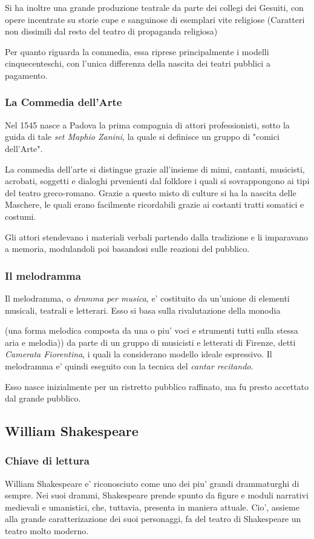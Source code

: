 \documentclass{article}
\begin{document}
{    Si ha inoltre una grande produzione teatrale da parte dei collegi dei Gesuiti, con opere incentrate su storie cupe e sanguinose di esemplari vite religiose \small{(Caratteri non dissimili dal resto del teatro di propaganda religiosa)}

    Per quanto riguarda la commedia, essa riprese principalmente i modelli cinquecenteschi, con l'unica differenza della nascita dei teatri pubblici a pagamento.

    \subsubsection{La Commedia dell'Arte}
    Nel 1545 nasce a Padova la prima compagnia di attori professionisti, sotto la guida di tale \textit{set Maphio Zanini}, la quale si definisce un gruppo di "comici dell'Arte".
    
    La commedia dell'arte si distingue grazie all'insieme di mimi, cantanti, musicisti, acrobati, soggetti e dialoghi prvenienti dal folklore i quali si sovrappongono ai tipi del teatro greco-romano. Grazie a questo misto di culture si ha la nascita delle Maschere, le quali erano facilmente ricordabili grazie ai costanti tratti somatici e costumi.

    Gli attori stendevano i materiali verbali partendo dalla tradizione e li imparavano a memoria, modulandoli poi basandosi sulle reazioni del pubblico.

    \subsubsection{Il melodramma}
    Il melodramma, o \textit{dramma per musica}, e' costituito da un'unione di elementi musicali, teatrali e letterari. Esso si basa sulla rivalutazione della monodia \small{(una forma melodica composta da una o piu' voci e strumenti tutti sulla stessa aria e melodia)) da parte di un gruppo di musicisti e letterati di Firenze, detti \textit{Camerata Fiorentina}, i quali la considerano modello ideale espressivo. Il melodramma e' quindi eseguito con la tecnica del \textit{cantar recitando}.

    Esso nasce inizialmente per un ristretto pubblico raffinato, ma fu presto accettato dal grande pubblico.
  }

  \subsection{William Shakespeare}
  {
    \subsubsection{Chiave di lettura}
    William Shakespeare e' riconosciuto come uno dei piu' grandi drammaturghi di sempre. Nei suoi drammi, Shakespeare prende spunto da figure e moduli narrativi medievali e umanistici, che, tuttavia, presenta in maniera attuale. Cio', assieme alla grande caratterizazione dei suoi personaggi, fa del teatro di Shakespeare un teatro molto moderno.

}}
\end{document}
